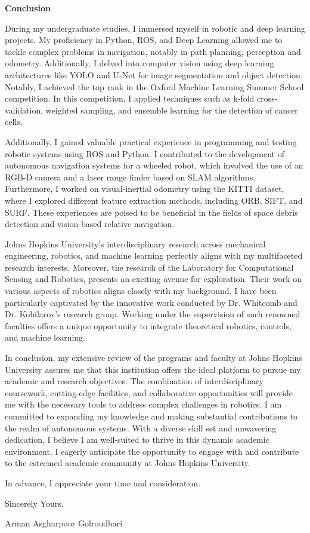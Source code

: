\documentclass[a4,20pt]{article}
\begin{document}
\begin{large}
\textbf{Conclusion}  \vspace{-0.35cm}

During my undergraduate studies, I immersed myself in robotic and deep learning projects. My proficiency in Python, ROS, and Deep Learning allowed me to tackle complex problems in navigation, notably in path planning, perception and odometry. Additionally, I delved into computer vision using deep learning architectures like YOLO and U-Net for image segmentation and object detection. Notably, I achieved the top rank in the Oxford Machine Learning Summer School competition. In this competition, I applied techniques such as k-fold cross-validation, weighted sampling, and ensemble learning for the detection of cancer cells. \vspace{-0.35cm}

Additionally, I gained valuable practical experience in programming and testing robotic systems using ROS and Python. I contributed to the development of autonomous navigation systems for a wheeled robot, which involved the use of an RGB-D camera and a laser range finder based on SLAM algorithms. Furthermore, I worked on visual-inertial odometry using the KITTI dataset, where I explored different feature extraction methods, including ORB, SIFT, and SURF. These experiences are poised to be beneficial in the fields of space debris detection and vision-based relative navigation.  \vspace{-0.25cm}

Johns Hopkins University's interdisciplinary research across mechanical engineering, robotics, and machine learning perfectly aligns with my multifaceted research interests. Moreover, the research of the Laboratory for Computational Sensing and Robotics, presents an exciting avenue for exploration. Their work on various aspects of robotics aligns closely with my background. I have been particularly captivated by the innovative work conducted by Dr. Whitcomb and Dr. Kobilarov’s research group. Working under the supervision of such renowned faculties offers a unique opportunity to integrate theoretical robotics, controls, and machine learning.  \vspace{-0.35cm}


In conclusion, my extensive review of the programs and faculty at Johns Hopkins University assures me that this institution offers the ideal platform to pursue my academic and research objectives. The combination of interdisciplinary coursework, cutting-edge facilities, and collaborative opportunities will provide me with the necessary tools to address complex challenges in robotics. I am committed to expanding my knowledge and making substantial contributions to the realm of autonomous systems. With a diverse skill set and unwavering dedication, I believe I am well-suited to thrive in this dynamic academic environment. I eagerly anticipate the opportunity to engage with and contribute to the esteemed academic community at Johns Hopkins University. \vspace{-0.15cm}

In advance, I appreciate your time and consideration. \par
\vspace{-0.4cm} Sincerely Yours, \par
\vspace{-0.4cm}Arman Asgharpoor Golroudbari \par
\end{large}
\end{document}
